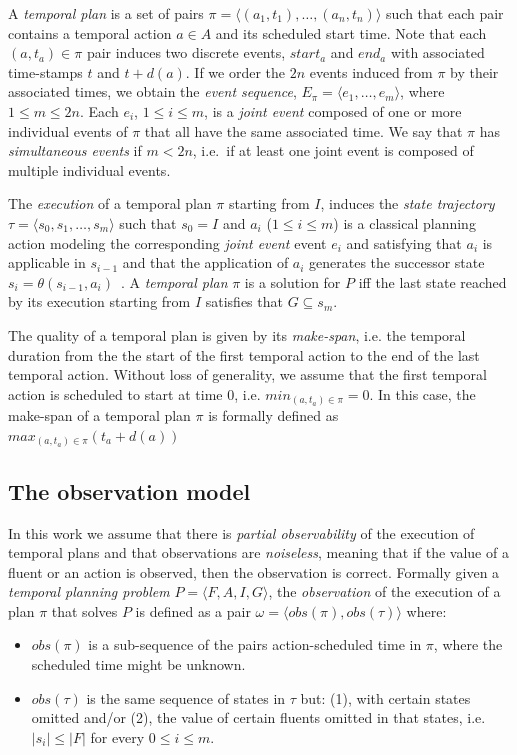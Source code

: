 \documentclass[letterpaper]{article} %
\newcommand{\tup}[1]{{\langle #1 \rangle}}
\begin{document}
A {\em temporal plan} is a set of pairs $\pi=\tup{(a_1,t_1), \ldots, (a_n,t_n)}$ such that each pair contains a temporal action $a\in A$ and its scheduled start time. Note that each $(a,t_a)\in \pi$ pair induces two discrete events, $start_a$ and $end_a$ with associated time-stamps $t$ and $t+d(a)$. If we order the $2n$ events induced from $\pi$ by their associated times, we obtain the {\em event sequence}, $E_{\pi}=\langle e_1,\ldots,e_m\rangle$, where {\small $1\leq m\leq 2n$}. Each $e_i$, {\small $1\leq i\leq m$}, is a {\em joint event} composed of one or more individual events of $\pi$ that all have the same associated time. We say that $\pi$ has {\em simultaneous events} if $m<2n$, i.e.~if at least one joint event is composed of multiple individual events. 

The {\em execution} of a temporal plan $\pi$ starting from $I$, induces the {\em state trajectory} $\tau=\tup{s_0, s_1, \ldots, s_m}$ such that $s_0=I$ and $a_i$ ({\small $1\leq i\leq m$}) is a classical planning action modeling the corresponding {\em joint event} event $e_i$ and satisfying that $a_i$ is applicable in $s_{i-1}$ and that the application of $a_i$ generates the successor state $s_i=\theta(s_{i-1},a_i)$~\cite{jimenez2015temporal}. A {\em temporal plan} $\pi$ is a solution for $P$ iff the last state reached by its execution starting from $I$ satisfies that $G\subseteq s_m$.

The quality of a temporal plan is given by its {\em make-span}, i.e. the temporal duration from the the start of the first temporal action to the end of the last temporal action. Without loss of generality, we assume that the first temporal action is scheduled to start at time 0, i.e. $min_{(a,t_a)\in\pi}= 0$. In this case, the make-span of a temporal plan $\pi$ is formally defined as $max_{(a,t_a)\in\pi}(t_a+d(a))$


\subsection{The observation model}
In this work we assume that there is {\em partial observability} of the execution of temporal plans and that observations are {\em noiseless}, meaning that if the value of a fluent or an action is observed, then the observation is correct. Formally given a {\em temporal planning problem} $P=\tup{F,A,I,G}$, the {\em observation} of the execution of a plan $\pi$ that solves $P$ is defined as a pair $\omega=\tup{obs(\pi),obs(\tau)}$ where:
\begin{itemize}
\item $obs(\pi)$ is a sub-sequence of the pairs action-scheduled time in $\pi$, where the scheduled time might be unknown.
\item $obs(\tau)$ is the same sequence of states in $\tau$ but: (1), with certain states omitted and/or (2), the value of certain fluents omitted in that states, i.e.~$|s_i|\leq |F|$ for every $0\leq i\leq m$.
\end{itemize}
\end{document}

